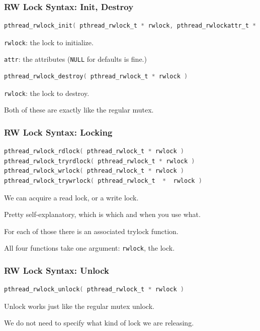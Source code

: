 \begin{frame}[fragile]
	\frametitle{RW Lock Syntax: Init, Destroy}

	\begin{lstlisting}[language=C]
pthread_rwlock_init( pthread_rwlock_t * rwlock, pthread_rwlockattr_t * attr )
\end{lstlisting}

	\texttt{rwlock}: the lock to initialize.

	\texttt{attr}: the attributes (\texttt{NULL} for defaults is fine.)


	\begin{lstlisting}[language=C]
pthread_rwlock_destroy( pthread_rwlock_t * rwlock )
\end{lstlisting}

	\texttt{rwlock}: the lock to destroy.


	Both of these are exactly like the regular mutex.

\end{frame}

\begin{frame}[fragile]
	\frametitle{RW Lock Syntax: Locking}

	\begin{lstlisting}[language=C]
pthread_rwlock_rdlock( pthread_rwlock_t * rwlock )
pthread_rwlock_tryrdlock( pthread_rwlock_t * rwlock )
pthread_rwlock_wrlock( pthread_rwlock_t * rwlock )
pthread_rwlock_trywrlock( pthread_rwlock_t  *  rwlock )
\end{lstlisting}

	We can acquire a read lock, or a write lock.

	Pretty self-explanatory, which is which and when you use what.

	For each of those there is an associated trylock function.

	All four functions take one argument: \texttt{rwlock}, the lock.


\end{frame}


\begin{frame}[fragile]
	\frametitle{RW Lock Syntax: Unlock}

	\begin{lstlisting}[language=C]
pthread_rwlock_unlock( pthread_rwlock_t * rwlock )
\end{lstlisting}

	Unlock works just like the regular mutex unlock.

	We do not need to specify what kind of lock we are releasing.

\end{frame}


